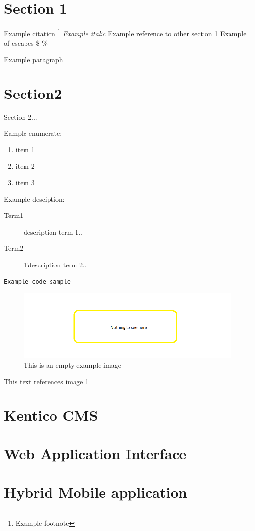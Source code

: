 \section{Section 1}\label{section1}
Example citation\cite{exampleArticle}
\footnote{Example footnote}
\textit{Example italic}
Example reference to other section \ref{section1}
Example of escapes \$ \% \- 

Example paragraph

\section{Section2} \label{section2}
Section 2...


Eample enumerate: \begin{enumerate}
\item item 1
\item item 2
\item item 3
\end{enumerate}

Example desciption:

\begin{description}
\item [Term1] \label{term1}description term 1..
\item [Term2] \label{term2}Tdescription term 2..
\end{description}

\lstset{style=sharpc}
\begin{lstlisting}
Example code sample
\end{lstlisting}

\begin{figure}[ht!]
  \centering
  \includegraphics[width=\textwidth]{Images/empty.png}
  \caption{This is an empty example image}
  \label{ExampleImage1}
\end{figure}

This text references image \ref{ExampleImage1}

\section{Kentico CMS} \label{analysisKenticoCMS}
\section{Web Application Interface} \label{analysisWebAPI}
\section{Hybrid Mobile application} \label{analysisHybridMobileApplication}
